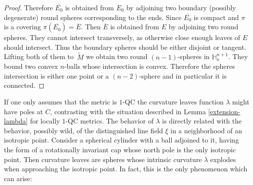 \documentclass[10pt]{amsart}
\theoremstyle{definition}
\theoremstyle{remark}
\numberwithin{equation}{section}
\begin{document}
\begin{proof}
Therefore $\overline{E_0}$ is obtained from $E_0$ by adjoining two boundary (possibly degenerate)
round spheres corresponding to the ends.
Since $\overline{E_0}$ is compact and $\pi$ is a covering $\pi(\overline{E_0})=\overline{E}$.
Then $\overline{E}$ is obtained from $E$ by adjoining two round spheres.
They cannot intersect transversely, as otherwise close enough leaves of $E$ should intersect.
Thus the boundary spheres should be either disjoint or tangent. Lifting both of them to~$\widetilde{M}$ we obtain two round
$(n-1)$-spheres in $\mathbb H_{\kappa}^{n+1}$. They bound two convex $n$-balls whose intersection is convex.
Therefore the spheres intersection is either one point or a $(n-2)$-sphere and in particular it is connected.
\end{proof}

If one only assumes that the metric is $1$-QC the curvature leaves function $\lambda$ might have poles at $C$, contrasting with
the situation described in Lemma \ref{extension-lambda} for locally $1$-QC metrics.
The behavior of $\lambda$ is directly related with the behavior, possibly wild, of the distinguished line field $\xi$ in a neighborhood of an isotropic point. Consider a spherical
cylinder with a ball adjoined to it, having the form of a
rotationally invariant cap whose north pole is the only isotropic point.
Then curvature leaves are spheres whose intrinsic curvature
$\lambda$ explodes when approaching the isotropic point.
In fact, this is the only phenomenon which can arise:
\end{document}

